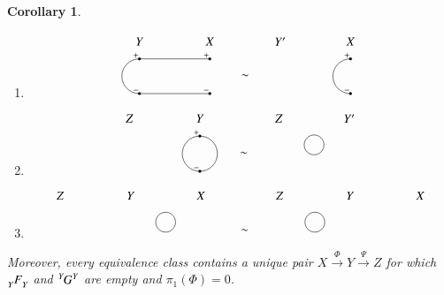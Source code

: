 \documentclass{amsart}
\newcommand{\To}[1]{\xrightarrow{#1}}
\newcommand{\feeddd}[3]{{\tensor*[^{#2}_{\color{white}{!}}]{{#1}}{^{#3}}}}%
\newcommand{\feedcc}[3]{{\tensor*[^{\color{white}{!}}_{#2}]{{#1}}{_{#3}}}}
\newtheorem{corollary}[subsection]{Corollary}
\theoremstyle{remark}
\theoremstyle{definition}
\begin{document}
\begin{corollary}
\begin{enumerate}
\begin{equation*}
\begin{tikzpicture}
  \node at (0,0) {$\sim$};
  \node at (1,1) {$Z$};
  \draw[fill=black] (1,0.5) circle (1pt);
  \node at (0.9,0.6) {$\scriptstyle+$};
  \draw[fill=black] (1,-0.5) circle (1pt);
  \node at (0.9,-0.4) {$\scriptstyle-$};
  \draw (1,0.5) arc (90:-90:0.5);
  \node at (3,1) {$Y'$};
 \end{tikzpicture}
\end{equation*}
\item[(E3).] 
\begin{equation*}
 \begin{tikzpicture}
  \node at (-3,1) {$Y$};
  \draw[fill=black] (-3,0.5) circle (1pt);
  \node at (-3.1,0.6) {$\scriptstyle+$};
  \draw[fill=black] (-3,-0.5) circle (1pt);
  \node at (-3.1,-0.4) {$\scriptstyle-$};
  \draw (-3,0.5) arc (90:270:0.5);
  \node at (-1,1) {$X$};
  \draw[fill=black] (-1,0.5) circle (1pt);
  \node at (-1.1,0.6) {$\scriptstyle+$};
  \draw[fill=black] (-1,-0.5) circle (1pt);
  \node at (-1.1,-0.4) {$\scriptstyle-$};
  \draw (-3,0.5) -- (-1,0.5);
  \draw (-3,-0.5) -- (-1,-0.5);
  \node at (0,0) {$\sim$};
  \node at (1,1) {$Y'$};
  \node at (3,1) {$X$};
  \draw[fill=black] (3,0.5) circle (1pt);
  \node at (2.9,0.6) {$\scriptstyle+$};
  \draw[fill=black] (3,-0.5) circle (1pt);
  \node at (2.9,-0.4) {$\scriptstyle-$};
  \draw (3,0.5) arc (90:270:0.5);
 \end{tikzpicture}
\end{equation*}
\item[(E4).] 
\begin{equation*}
 \begin{tikzpicture}
  \node at (-3.25,1) {$Z$};
  \node at (-1.25,1) {$Y$};
  \draw[fill=black] (-1.25,0.5) circle (1pt);
  \node at (-1.35,0.6) {$\scriptstyle+$};
  \draw[fill=black] (-1.25,-0.5) circle (1pt);
  \node at (-1.35,-0.4) {$\scriptstyle-$};
  \draw (-1.25,0.5) arc (90:-90:0.5);
  \draw (-1.25,0.5) arc (90:270:0.5);
  \node at (0,0) {$\sim$};
  \node at (1,1) {$Z$};
  \draw (2,0.25) circle (8pt);
  \node at (3,1) {$Y'$};
 \end{tikzpicture}
\end{equation*}
\item[(E5).] 
\begin{equation*}
 \begin{tikzpicture}
  \node at (-5.25,1) {$Z$};
  \node at (-3.25,1) {$Y$};
  \draw (-2.25,0.25) circle (8pt);
  \node at (-1.25,1) {$X$};
  \node at (0,0) {$\sim$};
  \node at (1,1) {$Z$};
  \draw (2,0.25) circle (8pt);
  \node at (3,1) {$Y$};
  \node at (5,1) {$X$};
 \end{tikzpicture}
\end{equation*}
\end{enumerate}
Moreover, every equivalence class contains a unique pair $X\To{\Phi}Y\To{\Psi}Z$ for which $\feedcc{F}{Y}{Y}$ and $\feeddd{G}{Y}{Y}$ are empty and $\pi_1(\Phi)=0$.

\end{corollary}
\end{document}
